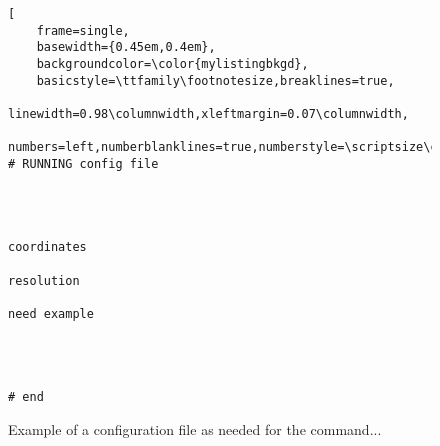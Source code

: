 
\begin{figure}[ht!]
\begin{lstlisting}[
	frame=single,
	basewidth={0.45em,0.4em},
	backgroundcolor=\color{mylistingbkgd},
	basicstyle=\ttfamily\footnotesize,breaklines=true,
	linewidth=0.98\columnwidth,xleftmargin=0.07\columnwidth,
	numbers=left,numberblanklines=true,numberstyle=\scriptsize\color{mylistingnclr}]
# RUNNING config file




coordinates

resolution

need example




# end
\end{lstlisting}
\caption{Example of a configuration file as needed for the command...}
\label{fig:run-config}
\end{figure}

